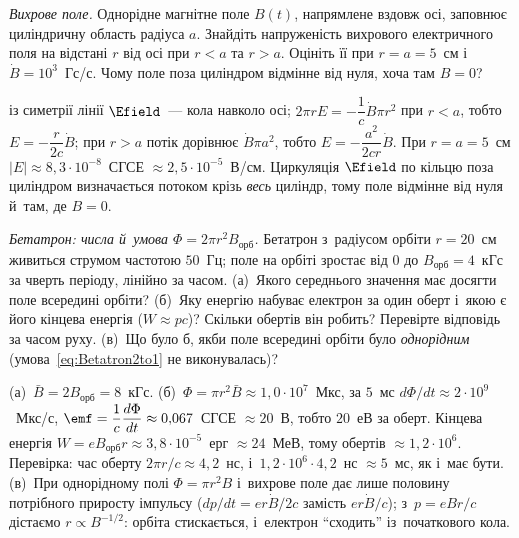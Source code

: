 \begin{problem}\label{prb:VortexCylinder}
	\emph{Вихрове поле.} Однорідне магнітне поле $B(t)$, напрямлене вздовж осі, заповнює
	циліндричну область радіуса $a$. Знайдіть напруженість вихрового електричного поля на
	відстані $r$ від осі при $r<a$ та $r>a$. Оцініть її при $r=a=5$~см і~$\dot{B}=10^{3}$~Гс/с.
	Чому поле поза циліндром відмінне від нуля, хоча там $B=0$?
	\begin{solution}
		із симетрії лінії $\Efield$~--- кола навколо осі; $2\pi
			rE=-\dfrac1c\dot B\pi r^2$ при $r<a$, тобто $E=-\dfrac{r}{2c}\dot B$; при $r>a$ потік
		дорівнює $\dot B\pi a^2$, тобто $E=-\dfrac{a^2}{2cr}\dot B$. При $r=a=5$~см
		$|E|\approx8{,}3\cdot10^{-8}$~СГСЕ $\approx2{,}5\cdot10^{-5}$~В/см. Циркуляція
		$\Efield$ по кільцю поза циліндром визначається потоком крізь \emph{весь} циліндр,
		тому поле відмінне від нуля й~там, де $B=0$.
	\end{solution}
\end{problem}

\begin{problem}\label{prb:BetatronTurn}
	\emph{Бетатрон: числа й~умова $\Phi=2\pi r^2B_\text{орб}$.} Бетатрон з~радіусом орбіти $r=20$~см живиться струмом частотою $50$~Гц; поле на орбіті
	зростає від $0$ до $B_\text{орб}=4$~кГс за чверть періоду, лінійно за часом. (а)~Якого середнього значення має досягти поле всередині орбіти?
	(б)~Яку енергію набуває електрон за один оберт і~якою є його кінцева енергія ($W\approx pc$)? Скільки обертів він робить? Перевірте відповідь
	за часом руху. (в)~Що було б, якби поле всередині орбіти було \emph{однорідним} (умова~\eqref{eq:Betatron2to1} не виконувалась)?
	\begin{solution}
		(а)~$\bar B=2B_\text{орб}=8$~кГс. (б)~$\Phi=\pi r^2\bar B\approx1{,}0\cdot10^{7}$~Мкс, за $5$~мс $d\Phi/dt\approx2\cdot10^{9}$~Мкс/с,
		$\emf=\dfrac1c\dfrac{d\Phi}{dt}\approx0{,}067$~СГСЕ $\approx20$~В, тобто $20$~еВ за оберт. Кінцева енергія $W=eB_\text{орб}r\approx3{,}8\cdot10^{-5}$~ерг
		$\approx24$~МеВ, тому обертів $\approx1{,}2\cdot10^{6}$. Перевірка: час оберту $2\pi r/c\approx4{,}2$~нс, і~$1{,}2\cdot10^{6}\cdot4{,}2$~нс $\approx5$~мс,
		як і~має бути. (в)~При однорідному полі $\Phi=\pi r^2B$ і~вихрове поле дає лише половину потрібного приросту імпульсу ($dp/dt=er\dot B/2c$ замість $er\dot B/c$);
		з~$p=eBr/c$ дістаємо $r\propto B^{-1/2}$: орбіта стискається, і~електрон \enquote{сходить} із~початкового кола.
	\end{solution}
\end{problem}

